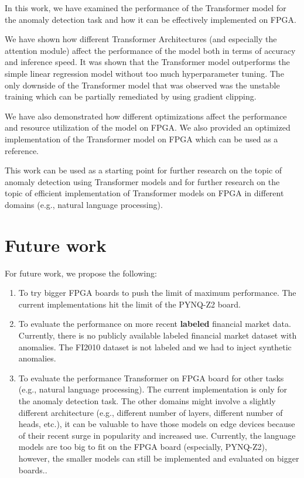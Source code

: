 \documentclass[a4paper, twoside]{report}
\theoremstyle{definition}
\numberwithin{equation}{section}
\begin{document}
In this work, we have examined the performance of the Transformer model
for the anomaly detection task and how it can be effectively implemented on
FPGA.

We have shown how different Transformer Architectures (and especially the attention module)
affect the performance of the model both in terms of accuracy and inference speed.
It was shown that the Transformer model outperforms the simple linear regression model
without too much hyperparameter tuning. The only downside of the Transformer model
that was observed was the unstable training which can be partially remediated
by using gradient clipping.

We have also demonstrated how different optimizations affect the performance
and resource utilization of the model on FPGA.
We also provided an optimized implementation of the Transformer model on FPGA
which can be used as a reference.

This work can be used as a starting point for further research on the topic of
anomaly detection using Transformer models and for further research on the topic
of efficient implementation of Transformer models on FPGA in different domains
(e.g., natural language processing).


\section*{Future work}
For future work, we propose the following:
\begin{enumerate}
    \item To try bigger FPGA boards to push the limit of maximum performance.
          The current implementations hit the limit of the PYNQ-Z2 board.
    \item To evaluate the performance on more recent \textbf{labeled} financial market data.
          Currently, there is no publicly available labeled financial market dataset
          with anomalies. The FI2010 dataset is not labeled and we had to inject synthetic anomalies.
    \item To evaluate the performance Transformer on FPGA board for other tasks (e.g., natural language processing).
          The current implementation is only for the anomaly detection task.
          The other domains might involve a slightly different architecture
          (e.g., different number of layers, different number of heads, etc.),
          it can be valuable to have those models on edge devices because of their
          recent surge in popularity and increased use.
          Currently, the language models are too big to fit on the FPGA board (especially, PYNQ-Z2),
          however, the smaller models can still be implemented and evaluated on bigger boards..
\end{enumerate}
\end{document}
